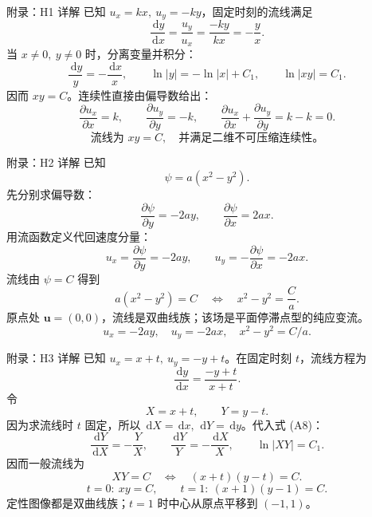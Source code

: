 \documentclass[aspectratio=169,10pt]{beamer}
\newcommand{\rd}{\,\mathrm{d}}
\newcommand{\pd}[2]{\frac{\partial #1}{\partial #2}}
\newcommand{\vc}[1]{\boldsymbol{#1}}
\begin{document}
\appendix

\begin{frame}{附录：H1 详解}
  \small
  已知 $u_x=kx,\ u_y=-ky$，固定时刻的流线满足
  \[
    \frac{\rd y}{\rd x}
      =\frac{u_y}{u_x}
      =\frac{-ky}{kx}
      =-\frac{y}{x}. \tag{A1}
  \]
  当 $x\neq0,\ y\neq0$ 时，分离变量并积分：
  \[
    \frac{\rd y}{y}=-\frac{\rd x}{x},
    \qquad
    \ln |y|=-\ln |x|+C_1,
    \qquad
    \ln |xy|=C_1. \tag{A2}
  \]
  因而 $xy=C$。连续性直接由偏导数给出：
  \[
    \pd{u_x}{x}=k,\qquad
    \pd{u_y}{y}=-k,
    \qquad
    \pd{u_x}{x}+\pd{u_y}{y}=k-k=0. \tag{A3}
  \]
  \[
    \boxed{\text{流线为 }xy=C,\quad \text{并满足二维不可压缩连续性。}}
  \]
\end{frame}

\begin{frame}{附录：H2 详解}
  \small
  已知
  \[
    \psi=a(x^2-y^2). \tag{A4}
  \]
  先分别求偏导数：
  \[
    \pd{\psi}{y}=-2ay,
    \qquad
    \pd{\psi}{x}=2ax. \tag{A5}
  \]
  用流函数定义代回速度分量：
  \[
    u_x=\pd{\psi}{y}=-2ay,
    \qquad
    u_y=-\pd{\psi}{x}=-2ax. \tag{A6}
  \]
  流线由 $\psi=C$ 得到
  \[
    a(x^2-y^2)=C
    \quad\Longleftrightarrow\quad
    x^2-y^2=\frac{C}{a}. \tag{A7}
  \]
  原点处 $\vc u=(0,0)$，流线是双曲线族；该场是平面停滞点型的纯应变流。
  \[
    \boxed{u_x=-2ay,\quad u_y=-2ax,\quad x^2-y^2=C/a.}
  \]
\end{frame}

\begin{frame}{附录：H3 详解}
  \small
  已知 $u_x=x+t,\ u_y=-y+t$。在固定时刻 $t$，流线方程为
  \[
    \frac{\rd y}{\rd x}
      =\frac{-y+t}{x+t}. \tag{A8}
  \]
  令
  \[
    X=x+t,\qquad Y=y-t. \tag{A9}
  \]
  因为求流线时 $t$ 固定，所以 $\rd X=\rd x,\ \rd Y=\rd y$。代入式 (A8)：
  \[
    \frac{\rd Y}{\rd X}=-\frac{Y}{X},
    \qquad
    \frac{\rd Y}{Y}=-\frac{\rd X}{X},
    \qquad
    \ln|XY|=C_1. \tag{A10}
  \]
  因而一般流线为
  \[
    XY=C
    \quad\Longleftrightarrow\quad
    (x+t)(y-t)=C. \tag{A11}
  \]
  \[
    \boxed{t=0:\ xy=C,\qquad t=1:\ (x+1)(y-1)=C.}
  \]
  定性图像都是双曲线族；$t=1$ 时中心从原点平移到 $(-1,1)$。
\end{frame}
\end{document}
